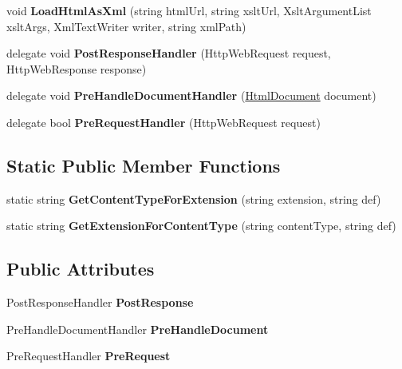 \begin{DoxyCompactItemize}
void {\bfseries Load\+Html\+As\+Xml} (string html\+Url, string xslt\+Url, Xslt\+Argument\+List xslt\+Args, Xml\+Text\+Writer writer, string xml\+Path)
\item 
\mbox{\label{class_html_agility_pack_1_1_html_web_ad1e916ff2a7d0208601048ba15c2de45}} 
delegate void {\bfseries Post\+Response\+Handler} (Http\+Web\+Request request, Http\+Web\+Response response)
\item 
\mbox{\label{class_html_agility_pack_1_1_html_web_a04fb9c8f6dd4672c86fcb4021008f64e}} 
delegate void {\bfseries Pre\+Handle\+Document\+Handler} (\hyperlink{class_html_agility_pack_1_1_html_document}{Html\+Document} document)
\item 
\mbox{\label{class_html_agility_pack_1_1_html_web_a114ad10087064af08de4d4293847ef30}} 
delegate bool {\bfseries Pre\+Request\+Handler} (Http\+Web\+Request request)
\end{DoxyCompactItemize}
\subsection*{Static Public Member Functions}
\begin{DoxyCompactItemize}
\item 
\mbox{\label{class_html_agility_pack_1_1_html_web_a54df7f220aa98ea6306f8a9b8cae8926}} 
static string {\bfseries Get\+Content\+Type\+For\+Extension} (string extension, string def)
\item 
\mbox{\label{class_html_agility_pack_1_1_html_web_ae5c69da6ed02e1fdce6708e043e22483}} 
static string {\bfseries Get\+Extension\+For\+Content\+Type} (string content\+Type, string def)
\end{DoxyCompactItemize}
\subsection*{Public Attributes}
\begin{DoxyCompactItemize}
\item 
\mbox{\label{class_html_agility_pack_1_1_html_web_a441d744d95ecd9fa8279d61001fa879c}} 
Post\+Response\+Handler {\bfseries Post\+Response}
\item 
\mbox{\label{class_html_agility_pack_1_1_html_web_afbfe4a399f07b040f11d279a83140e7c}} 
Pre\+Handle\+Document\+Handler {\bfseries Pre\+Handle\+Document}
\item 
\mbox{\label{class_html_agility_pack_1_1_html_web_af9f0c69c181ff9b265380ac656d42e60}} 
Pre\+Request\+Handler {\bfseries Pre\+Request}
\end{DoxyCompactItemize}
